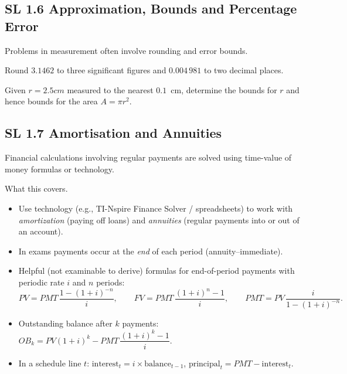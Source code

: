 \documentclass[11pt]{article}
\def\textbf#1{#1}%
\def\mathrm#1{#1}%
\def\SI#1#2{#1 #2}%
\newcommand{\tocsubsection}[1]{\subsection{#1}}
\newcounter{question}
\begin{document}
\tocsubsection{SL  1.6  \; Approximation,  Bounds  and  Percentage  Error}
Problems in measurement often involve rounding and error bounds.

\begin{question}
Round $3.1462$ to three significant figures and $0.004\,981$ to two decimal
places.
\end{question}

\begin{question}
Given $r=\SI{2.5}{cm}$ measured to the nearest $0.1$ cm, determine the bounds
for $r$ and hence bounds for the area $A=\pi r^2$.
\end{question}

\tocsubsection{SL  1.7  \; Amortisation  and  Annuities}
Financial calculations involving regular payments are solved using time-value
of money formulas or technology.


\begin{keyideas}
\textbf{What this covers.}
\begin{itemize}[itemsep=2pt]
  \item Use technology (e.g., TI-Nspire Finance Solver / spreadsheets) to work with
        \emph{amortization} (paying off loans) and \emph{annuities} (regular payments into or out of an account).
  \item In exams payments occur at the \emph{end} of each period (annuity–immediate).
  \item Helpful (not examinable to derive) formulas for end-of-period payments with periodic rate \(i\) and \(n\) periods:
  \[
    \mathrm{PV} = \mathrm{PMT}\,\frac{1-(1+i)^{-n}}{i},\qquad
    \mathrm{FV} = \mathrm{PMT}\,\frac{(1+i)^{n}-1}{i},\qquad
    \mathrm{PMT} = \mathrm{PV}\,\frac{i}{1-(1+i)^{-n}}.
  \]
  \item Outstanding balance after \(k\) payments:
        \( \mathrm{OB}_{k}=\mathrm{PV}(1+i)^{k}-\mathrm{PMT}\,\dfrac{(1+i)^{k}-1}{i}\).
  \item In a schedule line \(t\): \(\text{interest}_t=i\times\text{balance}_{t-1}\),\;
        \(\text{principal}_t=\mathrm{PMT}-\text{interest}_t\).
\end{itemize}
\end{keyideas}

\end{document}
